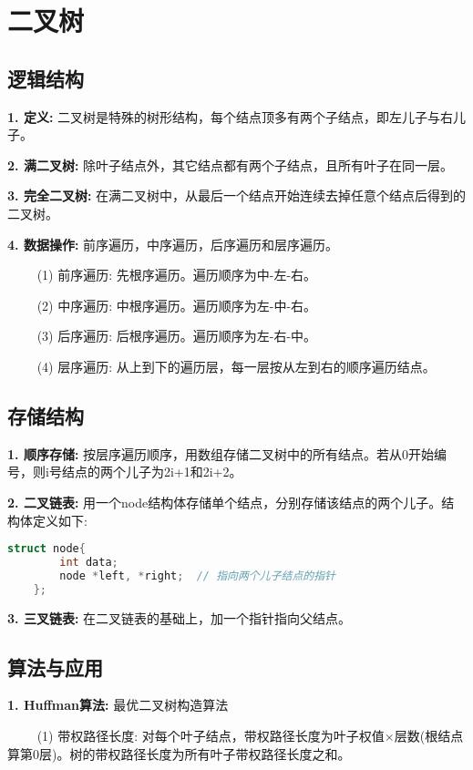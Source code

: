 \section{二叉树}

\subsection{逻辑结构}

\textbf{1. 定义: }二叉树是特殊的树形结构，每个结点顶多有两个子结点，即左儿子与右儿子。

\textbf{2. 满二叉树: }除叶子结点外，其它结点都有两个子结点，且所有叶子在同一层。

\textbf{3. 完全二叉树: }在满二叉树中，从最后一个结点开始连续去掉任意个结点后得到的二叉树。

\textbf{4. 数据操作: }前序遍历，中序遍历，后序遍历和层序遍历。

~~~~ (1) 前序遍历: 先根序遍历。遍历顺序为中-左-右。

~~~~ (2) 中序遍历: 中根序遍历。遍历顺序为左-中-右。

~~~~ (3) 后序遍历: 后根序遍历。遍历顺序为左-右-中。

~~~~ (4) 层序遍历: 从上到下的遍历层，每一层按从左到右的顺序遍历结点。

\subsection{存储结构}

\textbf{1. 顺序存储: }按层序遍历顺序，用数组存储二叉树中的所有结点。若从0开始编号，则i号结点的两个儿子为2i+1和2i+2。

\textbf{2. 二叉链表: }用一个node结构体存储单个结点，分别存储该结点的两个儿子。结构体定义如下: 

\begin{lstlisting}[language=C++]
    struct node{
        int data; 
        node *left, *right;  // 指向两个儿子结点的指针
    }; 
\end{lstlisting}

\textbf{3. 三叉链表: }在二叉链表的基础上，加一个指针指向父结点。

\subsection{算法与应用}

\textbf{1. Huffman算法: }最优二叉树构造算法

~~~~ (1) 带权路径长度: 对每个叶子结点，带权路径长度为叶子权值$\times$层数(根结点算第0层)。树的带权路径长度为所有叶子带权路径长度之和。

